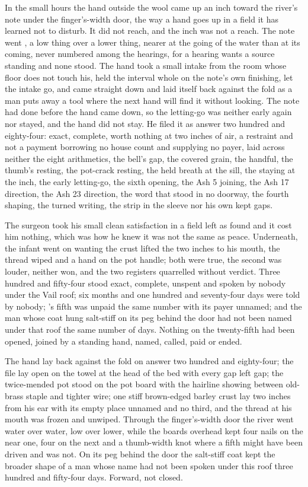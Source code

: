 In the small hours the hand outside the wool came up an inch toward the river's note under the finger's-width door, the way a hand goes up in a field it has learned not to disturb. It did not reach, and the inch was not a reach. The note went , a low thing over a lower thing, nearer at the going of the water than at its coming, never numbered among the hearings, for a hearing wants a source standing and none stood. The hand took a small intake from the room whose floor does not touch his, held the interval whole on the note's own finishing, let the intake go, and came straight down and laid itself back against the fold as a man puts away a tool where the next hand will find it without looking. The note had done before the hand came down, so the letting-go was neither early again nor stayed, and the hand did not stay. He filed it as answer two hundred and eighty-four: exact, complete, worth nothing at two inches of air, a restraint and not a payment borrowing no house count and supplying no payer, laid across neither the eight arithmetics, the bell's gap, the covered grain, the handful, the thumb's resting, the pot-crack resting, the held breath at the sill, the staying at the inch, the early letting-go, the sixth opening, the Ash 5 joining, the Ash 17 direction, the Ash 23 direction, the word that stood in no doorway, the fourth shaping, the turned writing, the strip in the sleeve nor his own kept gaps.

The surgeon took his small clean satisfaction in a field left as found and it cost him nothing, which was how he knew it was not the same as peace. Underneath, the infant went on wanting the crust lifted the two inches to his mouth, the thread wiped and a hand on the pot handle; both were true, the second was louder, neither won, and the two registers quarrelled without verdict. Three hundred and fifty-four stood exact, complete, unspent and spoken by nobody under the Vail roof; six months and one hundred and seventy-four days were told by nobody; 's fifth was unpaid the same number with its payer unnamed; and the man whose coat hung salt-stiff on its peg behind the door had not been named under that roof the same number of days. Nothing on the twenty-fifth had been opened, joined by a standing hand, named, called, paid or ended.

The hand lay back against the fold on answer two hundred and eighty-four; the file lay open on the towel at the head of the bed with every gap left gap; the twice-mended pot stood on the pot board with the hairline showing between old-brass staple and tighter wire; one stiff brown-edged barley crust lay two inches from his ear with its empty place unnamed and no third, and the thread at his mouth was frozen and unwiped. Through the finger's-width door the river went water over water, low over lower, while the boards overhead kept four nails on the near one, four on the next and a thumb-width knot where a fifth might have been driven and was not. On its peg behind the door the salt-stiff coat kept the broader shape of a man whose name had not been spoken under this roof three hundred and fifty-four days. Forward, not closed.
